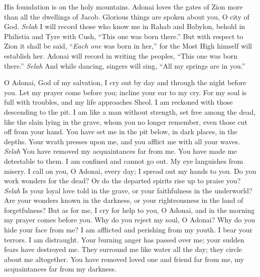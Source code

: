 \begin{biblechapter} %
 His foundation is on the holy mountains.
\verse Adonai loves the gates of Zion 
more than all the dwellings of Jacob.
\verse Glorious things are spoken about you, 
O city of God. \textit{Selah}
\verse I will record those who know me 
in Rahab and Babylon, 
behold in Philistia and Tyre with Cush, 
“This one was born there.”
\verse But with respect to Zion it shall be said, 
“\textit{Each one} was born in her,” 
for the Most High himself will establish her.
\verse Adonai will record in writing the peoples, 
“This one was born there.” \textit{Selah}
\verse And while dancing, singers will sing, 
“All my springs are in you.”
\end{biblechapter}

\begin{biblechapter} %
 O Adonai, God of my salvation, 
I cry out by day and through the night before you.
\verse Let my prayer come before you; 
incline your ear to my cry.
\verse For my soul is full with troubles, 
and my life approaches Sheol.
\verse I am reckoned with those descending to the pit. 
I am like a man without strength,
\verse set free among the dead, 
like the slain lying in the grave, 
whom you no longer remember, 
even those cut off from your hand.
\verse You have set me in the pit below, 
in dark places, in the depths.
\verse Your wrath presses upon me, 
and you afflict me with all your waves. \textit{Selah}
\verse You have removed my acquaintances far from me. 
You have made me detestable to them. 
I am confined and cannot go out.
\verse My eye languishes from misery. 
I call on you, O Adonai, every day; 
I spread out my hands to you.
\verse Do you work wonders for the dead? 
Or do the departed spirits rise up to praise you? \textit{Selah}
\verse Is your loyal love told in the grave, 
or your faithfulness in the underworld?
\verse Are your wonders known in the darkness, 
or your righteousness in the land of forgetfulness?
\verse But as for me, I cry for help to you, O Adonai, 
and in the morning my prayer comes before you.
\verse Why do you reject my soul, O Adonai? 
Why do you hide your face from me?
\verse I am afflicted and perishing from my youth. 
I bear your terrors. I am distraught.
\verse Your burning anger has passed over me; 
your sudden fears have destroyed me.
\verse They surround me like water all the day; 
they circle about me altogether.
\verse You have removed loved one and friend far from me, 
my acquaintances far from my darkness.
\end{biblechapter}

